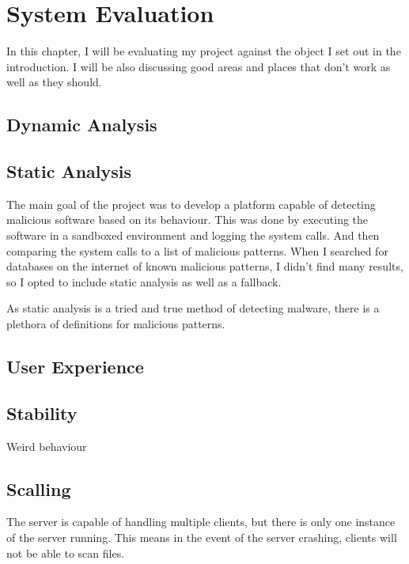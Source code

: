 \chapter{System Evaluation}

In this chapter, I will be evaluating my project against the object I set out in the introduction.
I will be also discussing good areas and places that don't work as well as they should.

\section{Dynamic Analysis}

\section{Static Analysis}
The main goal of the project was to develop a platform capable
of detecting malicious software based on its behaviour.
This was done by executing the software in a sandboxed environment and logging the system calls.
And then comparing the system calls to a list of malicious patterns.
When I searched for databases on the internet of known malicious patterns,
I didn't find many results, so I opted to include static analysis as well as a fallback.

As static analysis is a tried and true method of detecting malware,
there is a plethora of definitions for malicious patterns.

\section{User Experience}

\section{Stability}
Weird behaviour

\section{Scalling}
The server is capable of handling multiple clients, but there is only one instance of the server running.
This means in the event of the server crashing, clients will not be able to scan files.

